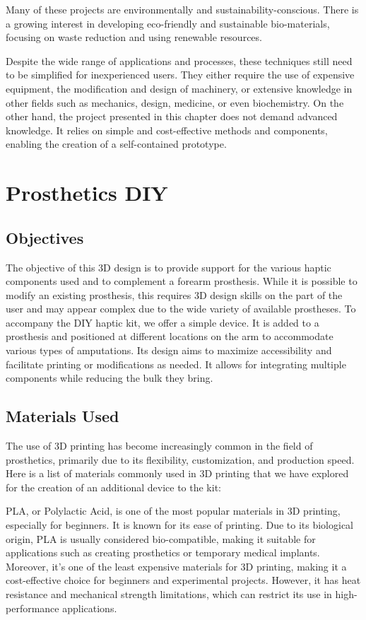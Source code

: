 Many of these projects are environmentally and sustainability-conscious. There is a growing interest in developing eco-friendly and sustainable bio-materials, focusing on waste reduction and using renewable resources.

Despite the wide range of applications and processes, these techniques still need to be simplified for inexperienced users. They either require the use of expensive equipment, the modification and design of machinery, or extensive knowledge in other fields such as mechanics, design, medicine, or even biochemistry. On the other hand, the project presented in this chapter does not demand advanced knowledge. It relies on simple and cost-effective methods and components, enabling the creation of a self-contained prototype.

\section{Prosthetics DIY}

\subsection{Objectives}

The objective of this 3D design is to provide support for the various haptic components used and to complement a forearm prosthesis. While it is possible to modify an existing prosthesis, this requires 3D design skills on the part of the user and may appear complex due to the wide variety of available prostheses. To accompany the DIY haptic kit, we offer a simple device. It is added to a prosthesis and positioned at different locations on the arm to accommodate various types of amputations. Its design aims to maximize accessibility and facilitate printing or modifications as needed. It allows for integrating multiple components while reducing the bulk they bring.

\subsection{Materials Used}
The use of 3D printing has become increasingly common in the field of prosthetics, primarily due to its flexibility, customization, and production speed. Here is a list of materials commonly used in 3D printing that we have explored for the creation of an additional device to the kit:

PLA, or Polylactic Acid, is one of the most popular materials in 3D printing, especially for beginners. It is known for its ease of printing. Due to its biological origin, PLA is usually considered bio-compatible, making it suitable for applications such as creating prosthetics or temporary medical implants. Moreover, it’s one of the least expensive materials for 3D printing, making it a cost-effective choice for beginners and experimental projects. However, it has heat resistance and mechanical strength limitations, which can restrict its use in high-performance applications.

